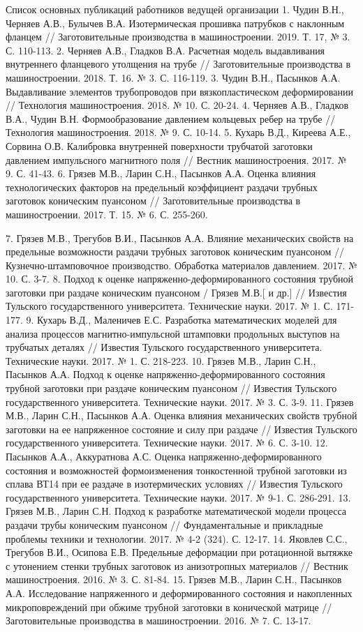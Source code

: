 Список основных публикаций работников ведущей организации
1. Чудин В.Н., Черняев А.В., Булычев В.А. Изотермическая прошивка патрубков с наклонным фланцем // Заготовительные производства в машиностроении. 2019. Т. 17, № 3. С. 110-113.
2. Черняев А.В., Гладков В.А. Расчетная модель выдавливания внутреннего фланцевого утолщения на трубе // Заготовительные производства в машиностроении. 2018. Т. 16. № 3. С. 116-119.
3. Чудин В.Н., Пасынков А.А. Выдавливание элементов трубопроводов при вязкопластическом деформировании // Технология машиностроения. 2018. № 10. С. 20-24.
4. Черняев А.В., Гладков В.А., Чудин В.Н. Формообразование давлением кольцевых ребер на трубе // Технология машиностроения. 2018. № 9. С. 10-14.
5. Кухарь В.Д., Киреева А.Е., Сорвина О.В. Калибровка внутренней поверхности трубчатой заготовки давлением импульсного магнитного поля // Вестник машиностроения. 2017. № 9. С. 41-43.
6. Грязев М.В., Ларин С.Н., Пасынков А.А. Оценка влияния технологических факторов на предельный коэффициент раздачи трубных заготовок коническим пуансоном // Заготовительные производства в машиностроении. 2017. Т. 15. № 6. С. 255-260.

7. Грязев М.В., Трегубов В.И., Пасынков А.А. Влияние механических свойств на предельные возможности раздачи трубных заготовок коническим пуансоном // Кузнечно-штамповочное производство. Обработка материалов давлением. 2017. № 10. С. 3-7.
8. Подход к оценке напряженно-деформированного состояния трубной заготовки при раздаче коническим пуансоном / Грязев М.В.[ и др.] // Известия Тульского государственного университета. Технические науки. 2017. № 1. 
С. 171-177.
9. Кухарь В.Д., Маленичев Е.С. Разработка математических моделей для анализа процессов магнитно-импульсной штамповки продольных выступов на трубчатых деталях // Известия Тульского государственного университета. Технические науки. 2017. № 1. С. 218-223.
10. Грязев М.В., Ларин С.Н., Пасынков А.А. Подход к оценке напряженно-деформированного состояния трубной заготовки при раздаче коническим пуансоном // Известия Тульского государственного университета. Технические науки. 2017. № 3. С. 3-9.
11. Грязев М.В., Ларин С.Н., Пасынков А.А. Оценка влияния механических свойств трубной заготовки на ее напряженное состояние и силу при раздаче // Известия Тульского государственного университета. Технические науки. 2017. № 6. С. 3-10.
12. Пасынков А.А., Аккуратнова А.С. Оценка напряженно-деформированного состояния и возможностей формоизменения тонкостенной трубной заготовки из сплава ВТ14 при ее раздаче в изотермических условиях // Известия Тульского государственного университета. Технические науки. 2017. № 9-1. С. 286-291.
13. Грязев М.В., Ларин С.Н. Подход к разработке математической модели процесса раздачи трубы коническим пуансоном // Фундаментальные и прикладные проблемы техники и технологии. 2017. № 4-2 (324). С. 12-17.
14. Яковлев С.С., Трегубов В.И., Осипова Е.В. Предельные деформации при ротационной вытяжке с утонением стенки трубных заготовок из анизотропных материалов // Вестник машиностроения. 2016. № 3. С. 81-84.
15. Грязев М.В., Ларин С.Н., Пасынков А.А. Исследование напряженного и деформированного состояния и накопленных микроповреждений при обжиме трубной заготовки в конической матрице // Заготовительные производства в машиностроении. 2016. № 7. С. 13-17.

\clearpage

